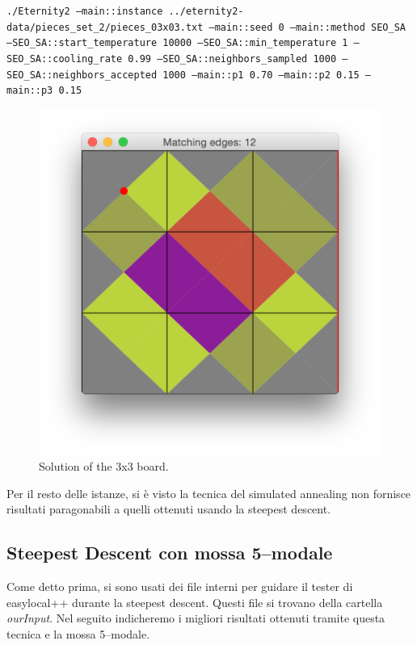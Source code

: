 	\texttt{./Eternity2 --main::instance ../eternity2-data/pieces\_set\_2/pieces\_03x03.txt --main::seed 0 --main::method SEO\_SA --SEO\_SA::start\_temperature 10000 --SEO\_SA::min\_temperature 1 --SEO\_SA::cooling\_rate 0.99 --SEO\_SA::neighbors\_sampled 1000 --SEO\_SA::neighbors\_accepted 1000 --main::p1 0.70  --main::p2 0.15  --main::p3 0.15}
	
	\begin{figure}[H]
	\centering
	\includegraphics[scale=0.25]{img/sol_03x03_SA}
	\caption{Solution of the 3x3 board.}
	\end{figure}

	Per il resto delle istanze, si è visto la tecnica del simulated annealing non fornisce risultati paragonabili a quelli ottenuti usando la steepest descent.




	\subsection{Steepest Descent con mossa 5--modale}
	Come detto prima, si sono usati dei file interni per guidare il tester di easylocal++ durante la steepest descent. Questi file si trovano della cartella \emph{ourInput}. Nel seguito indicheremo i migliori risultati ottenuti tramite questa tecnica e la mossa 5--modale.

